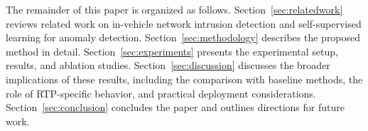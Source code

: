 The remainder of this paper is organized as follows. Section~\ref{sec:relatedwork} reviews related work on in-vehicle network intrusion detection and self-supervised learning for anomaly detection. Section~\ref{sec:methodology} describes the proposed method in detail. Section~\ref{sec:experiments} presents the experimental setup, results, and ablation studies. Section~\ref{sec:discussion} discusses the broader implications of these results, including the comparison with baseline methods, the role of RTP-specific behavior, and practical deployment considerations. Section~\ref{sec:conclusion} concludes the paper and outlines directions for future work.